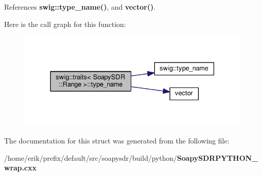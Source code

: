 References {\bf swig\+::type\+\_\+name()}, and {\bf vector()}.



Here is the call graph for this function\+:
\nopagebreak
\begin{figure}[H]
\begin{center}
\leavevmode
\includegraphics[width=330pt]{d3/d52/structswig_1_1traits_3_01SoapySDR_1_1Range_01_4_a20a6bf90b60076e4517207c3a6c77c98_cgraph}
\end{center}
\end{figure}




The documentation for this struct was generated from the following file\+:\begin{DoxyCompactItemize}
\item 
/home/erik/prefix/default/src/soapysdr/build/python/{\bf Soapy\+S\+D\+R\+P\+Y\+T\+H\+O\+N\+\_\+wrap.\+cxx}\end{DoxyCompactItemize}
